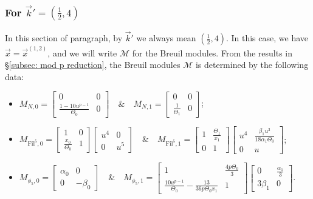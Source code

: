 \documentclass[11pt]{amsart}
\theoremstyle{definition}
\numberwithin{equation}{subsection}
\theoremstyle{plain}
\theoremstyle{plain}
\theoremstyle{plain}
\theoremstyle{plain}
\theoremstyle{plain}
\theoremstyle{plain}
\theoremstyle{plain}
\theoremstyle{plain}
\theoremstyle{plain}
\theoremstyle{plain}
\theoremstyle{plain}
\theoremstyle{plain}
\theoremstyle{definition}
\theoremstyle{definition}
\theoremstyle{definition}
\theoremstyle{remark}
\renewcommand{\(}{\textup{(}}
\renewcommand{\)}{\textup{)}}
\newcommand{\cM}{\mathcal{M}}
\newcommand{\Fil}{\mathrm{Fil}}
\newcommand{\vx}{\vec{x}}
\newcommand{\vk}{\vec{k}}
\begin{document}
\subsubsection{\textbf{For $\vk'=(\frac{1}{2},4)$}}\label{subsubsec: vr=(1,5), vk=(1/2,4)}
In this section of paragraph, by $\vk'$ we always mean $(\frac{1}{2},4)$. In this case, we have $\vx=\vx^{(1,2)}$, and we will write $\cM$ for the Breuil modules. From the results in \S\ref{subsec: mod p reduction}, the Breuil modules $\cM$ is determined by the following data:
\begin{itemize}[leftmargin=*]
  \item $M_{N,0}=
  \begin{bmatrix}
    0 & 0 \\
    \frac{1-10u^{p-1}}{\Theta_0} & 0
  \end{bmatrix}\quad\&\quad
  M_{N,1}=
  \begin{bmatrix}
    0 & 0 \\
    \frac{1}{\Theta_1} & 0
  \end{bmatrix}$;
  \item $M_{\Fil^5,0}=
  \begin{bmatrix}
    1 & 0 \\
    \frac{x_0}{\Theta_0} & 1
  \end{bmatrix}
  \begin{bmatrix}
    u^4 & 0 \\
    0 & u^5
  \end{bmatrix}\quad\&\quad
  M_{\Fil^5,1}=
  \begin{bmatrix}
    1 & \frac{\Theta_1}{x_1} \\
    0 & 1
  \end{bmatrix}
  \begin{bmatrix}
    u^4 & \frac{\beta_1u^3}{18\alpha_1\Theta_0} \\
    0 & u
  \end{bmatrix}$;
  \item $M_{\phi_5,0}=
  \begin{bmatrix}
    \alpha_0 & 0 \\
    0 & -\beta_0
  \end{bmatrix}\quad\&\quad
  M_{\phi_5,1}=
  \begin{bmatrix}
    1 & \frac{4p\Theta_0}{3} \\
    \frac{10u^{p-1}}{\Theta_0}-\frac{13}{36p\Theta_0x_1} & 1
  \end{bmatrix}
  \begin{bmatrix}
    0 & \frac{\alpha_1}{3} \\
    3\beta_1 & 0
  \end{bmatrix}.$
\end{itemize}
\end{document}
